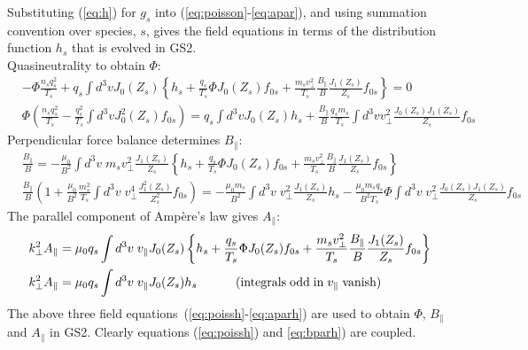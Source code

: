 \documentclass[10pt,a4paper]{article}
\begin{document}
Substituting (\ref{eq:h}) for $g_s$ into (\ref{eq:poisson}-\ref{eq:apar}), and
using summation convention over species, $s$, gives
the field equations in terms of the distribution function $h_s$ that is evolved in GS2.\\
\small Quasineutrality to obtain $\Phi$:
\begin{align}
  & -\Phi \frac{n_s q_s^2}{T_s} + q_s \int d^3v J_0(Z_s) \left\{ h_s +
    \frac{q_s}{T_s} \Phi J_0(Z_s) f_{0s} + \frac{m_s v_{\perp}^2}{T_s}
    \frac{B_{\parallel}}{B} \frac{J_1(Z_s)}{Z_s} f_{0s} \right\} = 0 \nonumber
  \\
  & \Phi \left( \frac{n_s q_s^2}{T_s} - \frac{q_s^2}{T_s} \int d^3v J_0^2(Z_s)
    f_{0s} \right) = q_s \int d^3v J_0(Z_s) h_s + \frac{B_{\parallel}}{B}
  \frac{q_s m_s}{T_s} \int d^3v v_{\perp}^2 \frac{J_0(Z_s) J_1(Z_s)}{Z_s}
  f_{0s} \label{eq:poissh}
\end{align}
Perpendicular force balance determines $B_{\parallel}$:
\begin{align}
  & \frac{B_{\parallel}}{B} = -\frac{\mu_0}{B^2} \int d^3v \; m_s v_{\perp}^2
  \frac{J_1(Z_s)}{Z_s} \left\{ h_s + \frac{q_s}{T_s} \Phi J_0(Z_s) f_{0s} +
    \frac{m_s v_{\perp}^2}{T_s} \frac{B_{\parallel}}{B} \frac{J_1(Z_s)}{Z_s}
    f_{0s} \right\} \nonumber \\
  & \frac{B_{\parallel}}{B} \left( 1 + \frac{\mu_0}{B^2} \frac{m_s^2 }{T_s}
    \int d^3v \; v_{\perp}^4 \frac{J_1^2(Z_s)}{Z_s^2} f_{0s}\right) =
  -\frac{\mu_0 m_s}{B^2} \int d^3v \; v_{\perp}^2 \frac{J_1(Z_s)}{Z_s} h_s -
  \frac{\mu_0 m_s q_s}{B^2 T_s} \Phi \int d^3v \; v_{\perp}^2 \frac{J_0(Z_s)
    J_1(Z_s)}{Z_s} f_{0s} \label{eq:bparh}
\end{align} 
The parallel component of Amp\`ere's law gives $A_{\parallel}$:
\begin{align}
  & k_{\perp}^2 A_{\parallel} = \mu_0 q_s \int d^3v \; v_{\parallel} J_0(Z_s)
  \left\{ h_s + \frac{q_s}{T_s} \Phi J_0(Z_s) f_{0s} + \frac{m_s
      v_{\perp}^2}{T_s} \frac{B_{\parallel}}{B} \frac{J_1(Z_s)}{Z_s}
    f_{0s} \right\} \nonumber \\
  & k_{\perp}^2 A_{\parallel} = \mu_0 q_s \int d^3v \; v_{\parallel} J_0(Z_s)
  h_s \hspace*{1cm} {\rm \; (integrals\; odd \; in \;} v_{\parallel} \; {\rm
    vanish )} \label{eq:aparh}
\end{align}
\normalsize The above three field equations~(\ref{eq:poissh}-\ref{eq:aparh})
are used to obtain $\Phi$, $B_{\parallel}$ and $A_{\parallel}$ in GS2.
Clearly equations (\ref{eq:poissh}) and \ref{eq:bparh}) are coupled.
\end{document}
